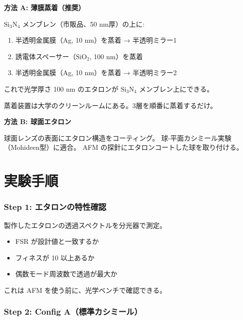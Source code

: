 \documentclass[12pt,a4paper]{article}
\begin{document}
\begin{expbox}[エタロン製作]
\textbf{方法 A: 薄膜蒸着（推奨）}

$\text{Si}_3\text{N}_4$ メンブレン（市販品、50 nm厚）の上に:
\begin{enumerate}
\item 半透明金属膜（Ag, 10 nm）を蒸着 → 半透明ミラー1
\item 誘電体スペーサー（$\text{SiO}_2$, 100 nm）を蒸着
\item 半透明金属膜（Ag, 10 nm）を蒸着 → 半透明ミラー2
\end{enumerate}

これで光学厚さ 100 nm のエタロンが $\text{Si}_3\text{N}_4$ メンブレン上にできる。

蒸着装置は大学のクリーンルームにある。3層を順番に蒸着するだけ。

\textbf{方法 B: 球面エタロン}

球面レンズの表面にエタロン構造をコーティング。
球-平面カシミール実験（Mohideen型）に適合。
AFM の探針にエタロンコートした球を取り付ける。
\end{expbox}

\part{実験手順}

\section{Step 1: エタロンの特性確認}

\begin{expbox}[光学テスト]
製作したエタロンの透過スペクトルを分光器で測定。
\begin{itemize}
\item FSR が設計値と一致するか
\item フィネスが 10 以上あるか
\item 偶数モード周波数で透過が最大か
\end{itemize}
これは AFM を使う前に、光学ベンチで確認できる。
\end{expbox}

\section{Step 2: Config A（標準カシミール）}
\end{document}
